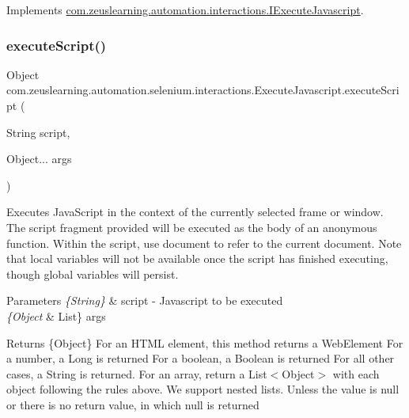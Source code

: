 Implements \hyperlink{interfacecom_1_1zeuslearning_1_1automation_1_1interactions_1_1IExecuteJavascript_a87933d4cbc9994eb6fedfa5b2c926802}{com.\+zeuslearning.\+automation.\+interactions.\+I\+Execute\+Javascript}.

\hypertarget{classcom_1_1zeuslearning_1_1automation_1_1selenium_1_1interactions_1_1ExecuteJavascript_adc7cfbadf6cfb984c5487e8bcab549d9}{}\label{classcom_1_1zeuslearning_1_1automation_1_1selenium_1_1interactions_1_1ExecuteJavascript_adc7cfbadf6cfb984c5487e8bcab549d9} 
\subsubsection{\texorpdfstring{execute\+Script()}{executeScript()}}
{\footnotesize\ttfamily Object com.\+zeuslearning.\+automation.\+selenium.\+interactions.\+Execute\+Javascript.\+execute\+Script (\begin{DoxyParamCaption}\item[{String}]{script,  }\item[{Object...}]{args }\end{DoxyParamCaption})\hspace{0.3cm}{\ttfamily [inline]}}

Executes Java\+Script in the context of the currently selected frame or window. The script fragment provided will be executed as the body of an anonymous function. Within the script, use document to refer to the current document. Note that local variables will not be available once the script has finished executing, though global variables will persist.


\begin{DoxyParams}{Parameters}
{\em \{\+String\}} & script -\/ Javascript to be executed \\
\hline
{\em \{\+Object} & List\} args \\
\hline
\end{DoxyParams}
\begin{DoxyReturn}{Returns}
\{Object\} For an H\+T\+ML element, this method returns a Web\+Element For a number, a Long is returned For a boolean, a Boolean is returned For all other cases, a String is returned. For an array, return a List$<$\+Object$>$ with each object following the rules above. We support nested lists. Unless the value is null or there is no return value, in which null is returned 
\end{DoxyReturn}


